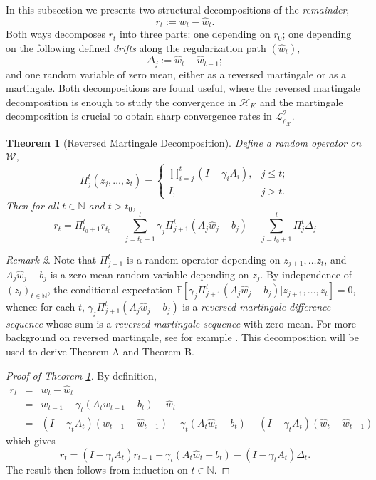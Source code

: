 \documentclass[twoside,11pt]{amsart}
\theoremstyle{theorem}
\newtheorem{thm}{Theorem}[section]
\theoremstyle{definition}
\theoremstyle{remark}
\newtheorem{rem}[thm]{Remark}
\newcommand{\DS}{\displaystyle}
\def\E{{\mathbb E}}        %
\def\L{{\mathscr L}}
\def\L2{{\mathscr L}^2_{\rho_\X}}
\def\w{\hat{w}}
\def\H{{\mathscr H}}
\def\W{{\mathscr W}}
\def\X{{\mathscr X}}
\def\N{{\mathbb N}}
\def\ga{\gamma}
\begin{document}
In this subsection we presents two structural decompositions of the \emph{remainder}, 
\begin{equation}
r_t:=w_t - \w_t. 
\end{equation}
Both ways decomposes $r_t$ into three parts: 
one depending on $r_0$; one depending on the following defined \emph{drifts} along the regularization path $(\w_t)$,
\begin{equation}
\Delta_j:=\w_t - \w_{t-1};
\end{equation}
and one random variable of zero mean, either as a reversed martingale or
as a martingale. Both decompositions are found useful, where the reversed martingale decomposition is enough to study the convergence in $\H_K$ 
and the martingale decomposition is crucial to obtain sharp convergence rates in $\L2$.

\begin{thm}[Reversed Martingale Decomposition] \label{thm:rmart} Define a random operator on $\W$,
\begin{equation*} \Pi_j^t(z_j,\ldots,z_t)=
\left\{
\begin{array}{lr}
\DS \prod_{i=j}^t \left( I - \gamma_i A_{i} \right), & j\leq t; \\
I, & j>t.
\end{array}
\right.
\end{equation*}
Then for all $t\in \N$ and $t>t_0$,
\begin{equation}  \label{eq:rmart}
r_{t} = \Pi_{t_0+1}^t r_{t_0} - \sum_{j=t_0+1}^t \gamma_j \Pi_{j+1}^t (A_j \w_j - b_j) - \sum_{j=t_0+1}^t \Pi_{j}^t \Delta_j
\end{equation}
\end{thm}

\begin{rem}
Note that $\Pi_{j+1}^t$ is a random operator depending on $z_{j+1},\ldots z_t$, and $A_j \w_j - b_j$ is a zero mean random variable depending on $z_j$.
By independence of $(z_t)_{t\in \N}$, the conditional expectation $\E[\gamma_j \Pi_{j+1}^t (A_j \w_j - b_j)|z_{j+1},\ldots,z_{t}]=0$, whence 
for each $t$, $\ga_j \Pi_{j+1}^t(A_j\w_j - b_j)$ is a \emph{reversed martingale difference sequence} whose sum is a \emph{reversed martingale sequence} with zero mean. 
For more background on reversed martingale, see for example \cite{Neveu75}. This decomposition will be used to derive Theorem A and Theorem B. 
\end{rem}

\begin{proof}[Proof of Theorem \ref{thm:rmart}] By definition,
\begin{eqnarray*}
r_{t} & = & w_{t}-\w_{t} \\
& = & w_{t-1} - \gamma_t (A_t w_{t-1} - b_t) - \w_{t} \\
& = & (I - \gamma_t A_t)(w_{t-1} - \w_{t-1}) - \gamma_t (A_t \w_t -b_t) - (I-\gamma_t A_t) (\w_t-\w_{t-1})
\end{eqnarray*}
which gives
\begin{equation}
 r_{t} = (I-\gamma_t A_t) r_{t-1} - \gamma_t (A_t \w_t - b_t) - (I-\gamma_t A_t)\Delta_t .
\end{equation}
The result then follows from induction on $t\in \N$. 
\end{proof}
\end{document}
